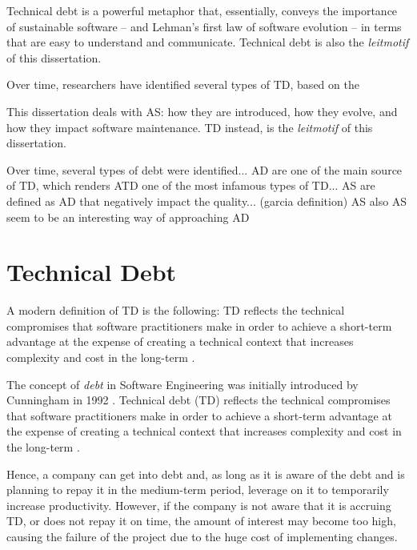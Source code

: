 Technical debt is a powerful metaphor that, essentially, conveys the importance of sustainable software -- and Lehman's first law of software evolution -- in terms that are easy to understand and communicate. 
Technical debt is also the \emph{leitmotif} of this dissertation.


Over time, researchers have identified several types of TD, based on the 


This dissertation deals with AS: how they are introduced, how they evolve, and how they impact software maintenance.
TD instead, is the \emph{leitmotif} of this dissertation.



Over time, several types of debt were identified... 
AD are one of the main source of TD, which renders ATD one of the most infamous types of TD...
AS are defined as AD that negatively impact the quality... (garcia definition)
AS also 
AS seem to be an interesting way of approaching AD 



\section{Technical Debt}
A modern definition of TD is the following: TD reflects the technical compromises that software practitioners make in order to achieve a short-term advantage at the expense of creating a technical context that increases complexity and cost in the long-term \cite{Avgeriou2016}. 

The concept of \textit{debt} in Software Engineering was initially introduced by Cunningham in 1992 \cite{Cunningham1992}.
Technical debt (TD) reflects the technical compromises that software practitioners make in order to achieve a short-term advantage at the expense of creating a technical context that increases complexity and cost in the long-term \cite{Avgeriou2016}.  

Hence, a company can get into debt and, as long as it is aware of the debt and is planning to repay it in the medium-term period, leverage on it to temporarily increase productivity.
However, if the company is not aware that it is accruing TD, or does not repay it on time, the amount of interest may become too high, causing the failure of the project due to the huge cost of implementing changes.


